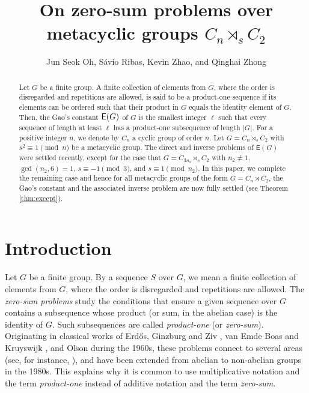 \documentclass[leqno,a4paper]{amsart}
\title{On zero-sum problems over metacyclic groups $C_n \rtimes_s C_2$}
\author{Jun Seok Oh, Sávio Ribas, Kevin Zhao, and Qinghai Zhong}
\date{}
\def\E{{\sf E}}
\theoremstyle{plain}
\theoremstyle{definition}
\numberwithin{equation}{section}
\begin{document}
	
	
	
	\maketitle
	
	\begin{abstract}
    Let $G$ be a finite group. A finite collection of elements from $G$, where the order is disregarded and repetitions are allowed, is said to be a product-one sequence if its elements can be ordered such that their product in $G$ equals the identity element of $G$.
    Then, the Gao's constant $\E(G)$ of $G$ is the smallest integer $\ell$ such that every sequence of length at least $\ell$ has a product-one subsequence of length $|G|$. For a positive integer $n$, we denote by $C_n$ a cyclic group of order $n$.
    Let $G = C_n \rtimes_s C_2$ with $s^2\equiv 1\pmod n$ be a metacyclic group. The direct and inverse problems of $\mathsf E(G)$ were settled recently, except for the case that $G=C_{3n_2}\rtimes_s C_2$ with $n_2\neq 1$, $\gcd(n_2,6)=1$, $s\equiv -1 \pmod 3$,  and $s\equiv 1\pmod {n_2}$. In this paper, we complete the remaining case and hence for all metacyclic groups of the form $G=C_n \rtimes C_2$, the Gao's constant and the associated inverse problem are now fully settled (see Theorem \ref{thm:except}).
	\end{abstract}
	
	
	
	
	\bigskip
	\section{Introduction}
	
	
	Let $G$ be a finite group. By a sequence $S$ over $G$, we mean a finite collection of elements from $G$, where the order is disregarded and repetitions are allowed. The {\em zero-sum problems} study the conditions that ensure  a given sequence over $G$ contains a subsequence whose product (or sum, in the abelian case) is the identity of $G$. Such subsequences are called {\em product-one} (or {\em zero-sum}). Originating in classical works of Erd\H os, Ginzburg and Ziv \cite{EGZ}, van Emde Boas and Kruyswijk \cite{vEBK}, and Olson \cite{Ols1,Ols2} during the 1960s, these problems connect to several areas (see, for instance, \cite{AGP,PlSc,GeHK}), and have been extended from abelian to non-abelian groups in the 1980s. This explains why it is common to use multiplicative notation and the term {\em product-one} instead of additive notation and the term {\em zero-sum}.
	
\end{document}
